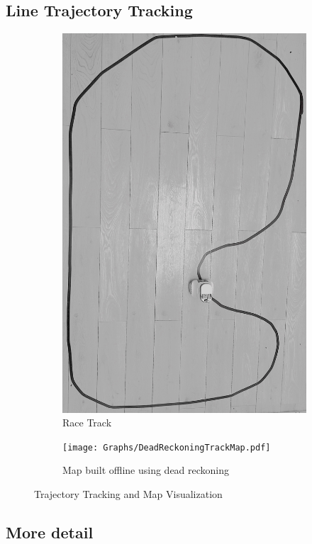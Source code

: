     \subsection{Line Trajectory Tracking}
    \begin{figure}[H]
        \centering
        \begin{subfigure}[b]{0.45\textwidth}
           
            \includegraphics[height=1.3\textwidth]{TrajTrak.jpeg}
            \caption{Race Track}
        \end{subfigure}
        \hfill
        \begin{subfigure}[b]{0.45\textwidth}
            \texttt{[image: Graphs/DeadReckoningTrackMap.pdf]}
            \caption{Map built offline using dead reckoning}
        \end{subfigure}
        \caption{Trajectory Tracking and Map Visualization}
        \label{fig:TrajTrack}
    \end{figure}
    \subsection{More detail}
